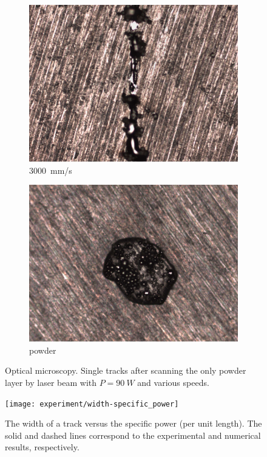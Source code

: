 \documentclass{article}
\begin{document}
\begin{figure}
\begin{subfigure}[b]{0.24\textwidth}
        \includegraphics[width=\textwidth]{experiment/photos/90W_V3000}
        \caption{\SI{3000}{mm/s}}
    \end{subfigure}\:
    \begin{subfigure}[b]{0.24\textwidth}
        \includegraphics[width=\textwidth]{experiment/photos/powder}
        \caption{powder}
    \end{subfigure}
    \caption{
        Optical microscopy.
        Single tracks after scanning the only powder layer by laser beam
        with \(P=\SI{90}{W}\) and various speeds.
    }
    \label{fig:3d:experiment}
\end{figure}

\begin{figure}
    \centering
    \texttt{[image: experiment/width-specific\_power]}
    \caption{
        The width of a track versus the specific power (per unit length).
        The solid and dashed lines correspond to the experimental and numerical results, respectively.
    }\label{fig:3d:width}
\end{figure}
\end{document}
